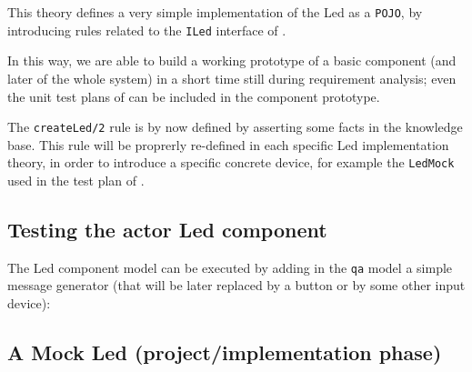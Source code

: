 



This theory defines a very simple implementation of the Led as a \texttt{POJO}, by introducing rules related to the \texttt{ILed} interface of . 


In this way, we are able to build a working prototype of a basic component (and later of the whole system) in a short time still during requirement analysis; even the unit test plans of  can be included in the component prototype.

The \texttt{createLed/2} rule is by now defined by asserting some facts in the knowledge base. This rule will be proprerly re-defined in each specific Led implementation theory, in order to introduce a specific concrete device, for example the \texttt{LedMock} used in the test plan of .
 


\subsection{Testing the actor Led component} 
The Led component model can be executed by adding in the \texttt{qa} model a simple message generator (that will be later replaced by a button or by some other input  device):


\subsection{A Mock Led (project/implementation phase)}

